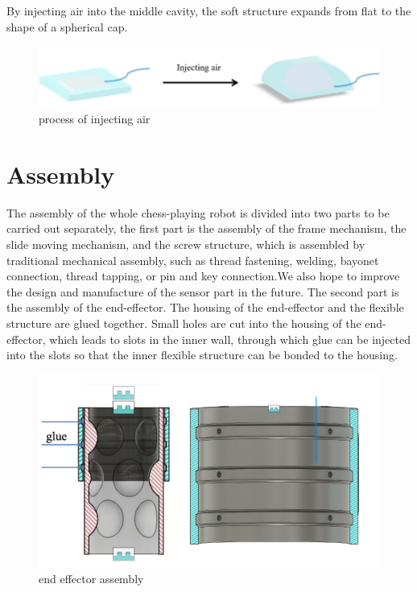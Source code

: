 \documentclass[10pt, a4paper, twocolumn]{article}
\begin{document}
By injecting air into the middle cavity, the soft structure expands from flat to the shape of a spherical cap.

\begin{figure}
    \centering
    \includegraphics[width=0.8\linewidth]{process of injecting air.png}
    \caption{process of injecting air}
    \label{fig:process of injecting air}
\end{figure}



\section{Assembly}
The assembly of the whole chess-playing robot is divided into two parts to be carried out separately, the first part is the assembly of the frame mechanism, the slide moving mechanism, and the screw structure, which is assembled by traditional mechanical assembly, such as thread fastening, welding, bayonet connection, thread tapping, or pin and key connection.We also hope to improve the design and manufacture of the sensor part in the future.
The second part is the assembly of the end-effector. The housing of the end-effector and the flexible structure are glued together. Small holes are cut into the housing of the end-effector, which leads to slots in the inner wall, through which glue can be injected into the slots so that the inner flexible structure can be bonded to the housing.
\begin{figure}
    \centering
    \includegraphics[width=0.8\linewidth]{end effector assembly.png}
    \caption{end effector assembly}
    \label{fig:end effector assembly}
\end{figure}
\end{document}
